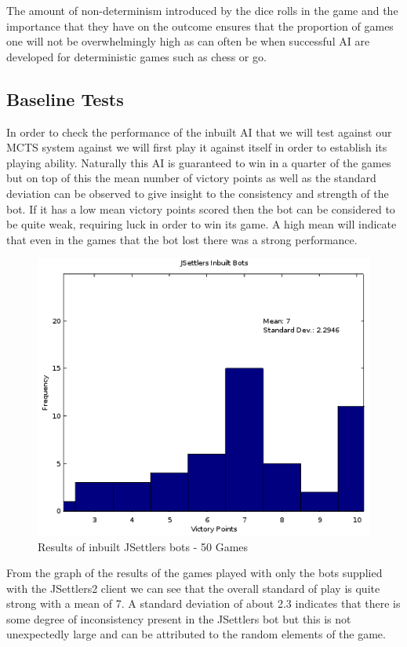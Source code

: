 \documentclass[]{article}
\begin{document}
\par The amount of non-determinism introduced by the dice rolls in the game and the importance that they have on the outcome ensures that the proportion of games one will not be overwhelmingly high as can often be when successful AI are developed for deterministic games such as chess or go. 


\subsection{Baseline Tests} 
In order to check the performance of the inbuilt AI that we will test against our MCTS system against we will first play it against itself in order to establish its playing ability. Naturally this AI is guaranteed to win in a quarter of the games but on top of this the mean number of victory points as well as the standard deviation can be observed to give insight to the consistency and strength of the bot. If it has a low mean victory points scored then the bot can be considered to be quite weak, requiring luck in order to win its game. A high mean will indicate that even in the games that the bot lost there was a strong performance.

\begin{center}
\begin{figure}[H]
 \centerline{\includegraphics[width=0.75\linewidth]{figures/inbuilt.png}}
  \caption{Results of inbuilt JSettlers bots - 50 Games}
  \label{fig:inbuilt} 
\end{figure}
\end{center}

\par From the graph of the results of the games played with only the bots supplied with the JSettlers2 client we can see that the overall standard of play is quite strong with a mean of 7. A standard deviation of about 2.3 indicates that there is some degree of inconsistency present in the JSettlers bot but this is not unexpectedly large and can be attributed to the random elements of the game.  
\end{document}
